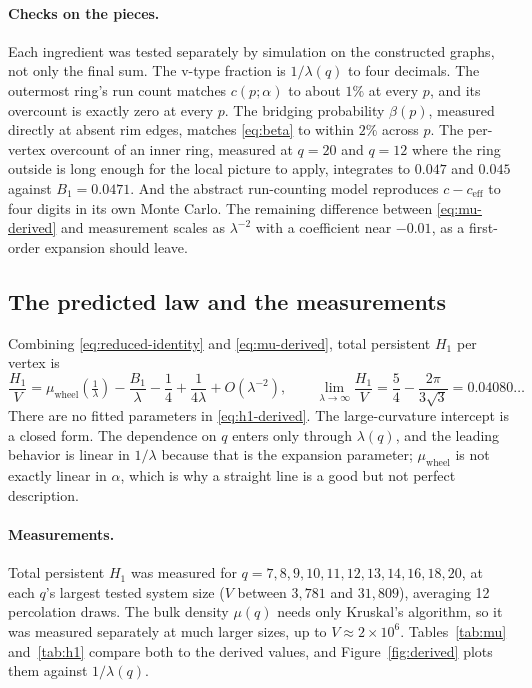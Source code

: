 \documentclass[11pt]{article}
\begin{document}
\paragraph{Checks on the pieces.} Each ingredient was tested separately by simulation on the constructed graphs, not only the final sum. The v-type fraction is $1/\lambda(q)$ to four decimals. The outermost ring's run count matches $c(p;\alpha)$ to about $1\%$ at every $p$, and its overcount is exactly zero at every $p$. The bridging probability $\beta(p)$, measured directly at absent rim edges, matches \eqref{eq:beta} to within $2\%$ across $p$. The per-vertex overcount of an inner ring, measured at $q=20$ and $q=12$ where the ring outside is long enough for the local picture to apply, integrates to $0.047$ and $0.045$ against $B_1=0.0471$. And the abstract run-counting model reproduces $c-c_{\mathrm{eff}}$ to four digits in its own Monte Carlo. The remaining difference between \eqref{eq:mu-derived} and measurement scales as $\lambda^{-2}$ with a coefficient near $-0.01$, as a first-order expansion should leave.

\subsection{The predicted law and the measurements}
\label{sec:measurements}

Combining \eqref{eq:reduced-identity} and \eqref{eq:mu-derived}, total persistent $H_1$ per vertex is
\begin{equation}
\frac{H_1}{V} = \mu_{\mathrm{wheel}}\!\left(\tfrac1\lambda\right) - \frac{B_1}{\lambda} - \frac14 + \frac{1}{4\lambda} + O(\lambda^{-2}),
\qquad
\lim_{\lambda\to\infty}\frac{H_1}{V} = \frac54 - \frac{2\pi}{3\sqrt3} = 0.04080\ldots
\label{eq:h1-derived}
\end{equation}
There are no fitted parameters in \eqref{eq:h1-derived}. The large-curvature intercept is a closed form. The dependence on $q$ enters only through $\lambda(q)$, and the leading behavior is linear in $1/\lambda$ because that is the expansion parameter; $\mu_{\mathrm{wheel}}$ is not exactly linear in $\alpha$, which is why a straight line is a good but not perfect description.

\paragraph{Measurements.} Total persistent $H_1$ was measured for $q=7,8,9,10,11,12,13,14,16,18,20$, at each $q$'s largest tested system size ($V$ between $3{,}781$ and $31{,}809$), averaging 12 percolation draws. The bulk density $\mu(q)$ needs only Kruskal's algorithm, so it was measured separately at much larger sizes, up to $V\approx2\times10^6$. Tables~\ref{tab:mu} and~\ref{tab:h1} compare both to the derived values, and Figure~\ref{fig:derived} plots them against $1/\lambda(q)$.
\end{document}
